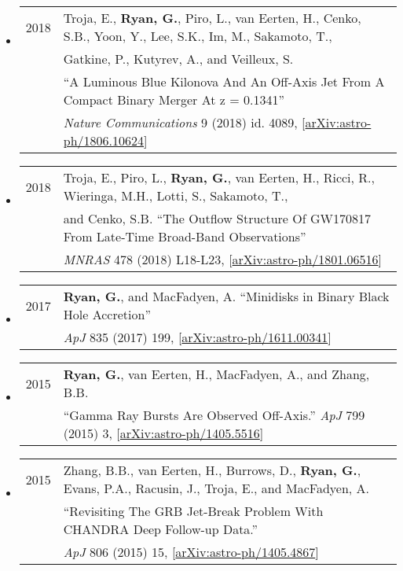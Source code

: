 \begin{itemize}
\item \begin{tabular}{ll}
2018 & Troja, E., {\bf Ryan, G.}, Piro, L., van Eerten, H., Cenko, S.B., Yoon, Y., Lee, S.K., Im, M., Sakamoto, T., \\
	& Gatkine, P., Kutyrev, A., and Veilleux, S. \\
	& ``A Luminous Blue Kilonova And An Off-Axis Jet From A Compact Binary Merger At z = 0.1341''\\
	& \emph{Nature Communications} 9 (2018) id. 4089, [\href{https://arxiv.org/abs/1806.10624}{arXiv:astro-ph/1806.10624}]
\end{tabular}

\item \begin{tabular}{ll}
2018 & Troja, E., Piro, L., {\bf Ryan, G.}, van Eerten, H., Ricci, R., Wieringa, M.H., Lotti, S., Sakamoto, T.,\\
	& and Cenko, S.B. ``The Outflow Structure Of GW170817 From Late-Time Broad-Band Observations'' \\
	& \emph{MNRAS} 478 (2018) L18-L23, [\href{https://arxiv.org/abs/1801.06516}{arXiv:astro-ph/1801.06516}]
\end{tabular}

\item \begin{tabular}{ll}
2017 & {\bf Ryan, G.}, and MacFadyen, A. ``Minidisks in Binary Black Hole Accretion'' \\ 
	& \emph{ApJ} 835 (2017) 199, [\href{https://arxiv.org/abs/1611.00341}{arXiv:astro-ph/1611.00341}]
\end{tabular}

\item \begin{tabular}{ll}
2015 & {\bf Ryan, G.}, van Eerten, H., MacFadyen, A., and Zhang, B.B. \\ 
	& ``Gamma Ray Bursts Are Observed Off-Axis.''  \emph{ApJ} 799 (2015) 3, [\href{https://arxiv.org/abs/1405.5516}{arXiv:astro-ph/1405.5516}] \\
\end{tabular}

\item \begin{tabular}{ll}
2015 & Zhang, B.B., van Eerten, H., Burrows, D., {\bf Ryan, G.}, {Evans}, P.A., Racusin, J., Troja, E., and MacFadyen, A. \\
 & ``Revisiting The GRB Jet-Break Problem With CHANDRA Deep Follow-up Data.''  \\
&  \emph{ApJ} 806 (2015) 15, [\href{https://arxiv.org/abs/1405.4867}{arXiv:astro-ph/1405.4867}] \\
\end{tabular}


\end{itemize}

